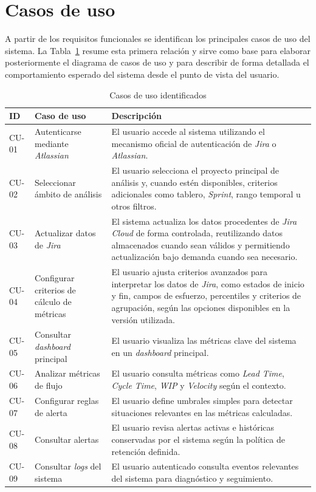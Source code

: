 \FloatBarrier
\section{Casos de uso}

A partir de los requisitos funcionales se identifican los principales casos de uso del sistema. La Tabla~\ref{tab:casos-uso-identificados} resume esta primera relación y sirve como base para elaborar posteriormente el diagrama de casos de uso y para describir de forma detallada el comportamiento esperado del sistema desde el punto de vista del usuario.

{\renewcommand{\arraystretch}{1.28}\footnotesize
\begin{longtable}{p{1.35cm}p{3.45cm}p{7.55cm}}
\caption{Casos de uso identificados}\label{tab:casos-uso-identificados}\\
\toprule
\textbf{ID} & \textbf{Caso de uso} & \textbf{Descripción} \\
\midrule
CU-01 & Autenticarse mediante \textit{Atlassian} & El usuario accede al sistema utilizando el mecanismo oficial de autenticación de \textit{Jira} o \textit{Atlassian}. \\
CU-02 & Seleccionar ámbito de análisis & El usuario selecciona el proyecto principal de análisis y, cuando estén disponibles, criterios adicionales como tablero, \textit{Sprint}, rango temporal u otros filtros. \\
CU-03 & Actualizar datos de \textit{Jira} & El sistema actualiza los datos procedentes de \textit{Jira Cloud} de forma controlada, reutilizando datos almacenados cuando sean válidos y permitiendo actualización bajo demanda cuando sea necesario. \\
CU-04 & Configurar criterios de cálculo de métricas & El usuario ajusta criterios avanzados para interpretar los datos de \textit{Jira}, como estados de inicio y fin, campos de esfuerzo, percentiles y criterios de agrupación, según las opciones disponibles en la versión utilizada. \\
CU-05 & Consultar \textit{dashboard} principal & El usuario visualiza las métricas clave del sistema en un \textit{dashboard} principal. \\
CU-06 & Analizar métricas de flujo & El usuario consulta métricas como \textit{Lead Time}, \textit{Cycle Time}, \textit{WIP} y \textit{Velocity} según el contexto. \\
CU-07 & Configurar reglas de alerta & El usuario define umbrales simples para detectar situaciones relevantes en las métricas calculadas. \\
CU-08 & Consultar alertas & El usuario revisa alertas activas e históricas conservadas por el sistema según la política de retención definida. \\
CU-09 & Consultar \textit{logs} del sistema & El usuario autenticado consulta eventos relevantes del sistema para diagnóstico y seguimiento. \\
\bottomrule
\end{longtable}
\vspace{0.45em}
}

